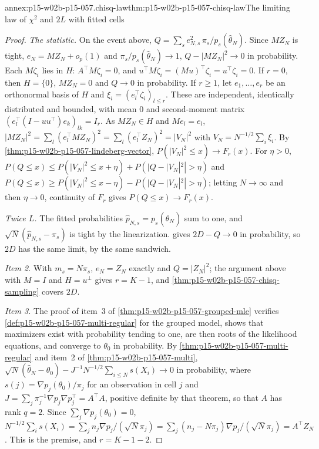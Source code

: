 \begin{annexitem}{annex:p15-w02b-p15-057.chisq-law}{thm:p15-w02b-p15-057-chisq-law}{The limiting law of \(\chi^2\) and \(2L\) with fitted cells}
\begin{proof}
\emph{The statistic.} On the event above,
\(Q=\sum_se_{N,s}^2\,\pi_s/p_s(\widehat\theta_N)\). Since \(MZ_N\) is tight,
\(e_N=MZ_N+o_p(1)\) and \(\pi_s/p_s(\widehat\theta_N)\to1\),
\(Q-|MZ_N|^2\to0\) in probability. Each \(M\zeta_i\) lies in \(H\):
\(A^{\top}M\zeta_i=0\), and \(u^{\top}M\zeta_i=(Mu)^{\top}\zeta_i=
u^{\top}\zeta_i=0\). If \(r=0\), then \(H=\{0\}\), \(MZ_N=0\) and
\(Q\to0\) in probability. If \(r\geq1\), let \(e_1,\ldots,e_r\) be an
orthonormal basis of \(H\) and \(\xi_i=(e_l^{\top}\zeta_i)_{l\leq r}\).
These are independent, identically distributed and bounded, with mean
\(0\) and second-moment matrix \((e_l^{\top}(I-uu^{\top})e_k)_{lk}=I_r\).
As \(MZ_N\in H\) and \(Me_l=e_l\),
\(|MZ_N|^2=\sum_l(e_l^{\top}MZ_N)^2=\sum_l(e_l^{\top}Z_N)^2=|V_N|^2\) with
\(V_N=N^{-1/2}\sum_i\xi_i\). By
\cref{thm:p15-w02b-p15-057-lindeberg-vector},
\(P(|V_N|^2\leq x)\to F_r(x)\). For \(\eta>0\),
\(P(Q\leq x)\leq P(|V_N|^2\leq x+\eta)+P(|Q-|V_N|^2|>\eta)\) and
\(P(Q\leq x)\geq P(|V_N|^2\leq x-\eta)-P(|Q-|V_N|^2|>\eta)\); letting
\(N\to\infty\) and then \(\eta\to0\), continuity of \(F_r\) gives
\(P(Q\leq x)\to F_r(x)\).

\emph{Twice \(L\).} The fitted probabilities \(\hat p_{N,s}=p_s(\widehat
\theta_N)\) sum to one, and \(\sqrt N(\hat p_{N,s}-\pi_s)\) is tight by the
linearization.  gives
\(2D-Q\to0\) in probability, so \(2D\) has the same limit, by the same
sandwich.

\emph{Item 2.} With \(m_s=N\pi_s\), \(e_N=Z_N\) exactly and \(Q=|Z_N|^2\);
the argument above with \(M=I\) and \(H=u^\perp\) gives \(r=K-1\), and
\cref{thm:p15-w02b-p15-057-chisq-sampling} covers \(2D\).

\emph{Item 3.} The proof of item~3 of
\cref{thm:p15-w02b-p15-057-grouped-mle} verifies
\cref{def:p15-w02b-p15-057-multi-regular} for the grouped model, shows that
maximizers exist with probability tending to one, are then roots of the
likelihood equations, and converge to \(\theta_0\) in probability. By
\cref{thm:p15-w02b-p15-057-multi-regular} and item~2 of
\cref{thm:p15-w02b-p15-057-multi},
\(\sqrt N(\widehat\theta_N-\theta_0)-J^{-1}N^{-1/2}\sum_{i\leq N}s(X_i)\to0\)
in probability, where \(s(j)=\nabla p_j(\theta_0)/\pi_j\) for an
observation in cell \(j\) and \(J=\sum_j\pi_j^{-1}\nabla p_j\nabla p_j^{\top}
=A^{\top}A\), positive definite by that theorem, so that \(A\) has rank
\(q=2\). Since \(\sum_j\nabla p_j(\theta_0)=0\),
\(N^{-1/2}\sum_is(X_i)=\sum_jn_j\nabla p_j/(\sqrt N\pi_j)=
\sum_j(n_j-N\pi_j)\nabla p_j/(\sqrt N\pi_j)=A^{\top}Z_N\). This is the
premise, and \(r=K-1-2\).
\end{proof}
\end{annexitem}

